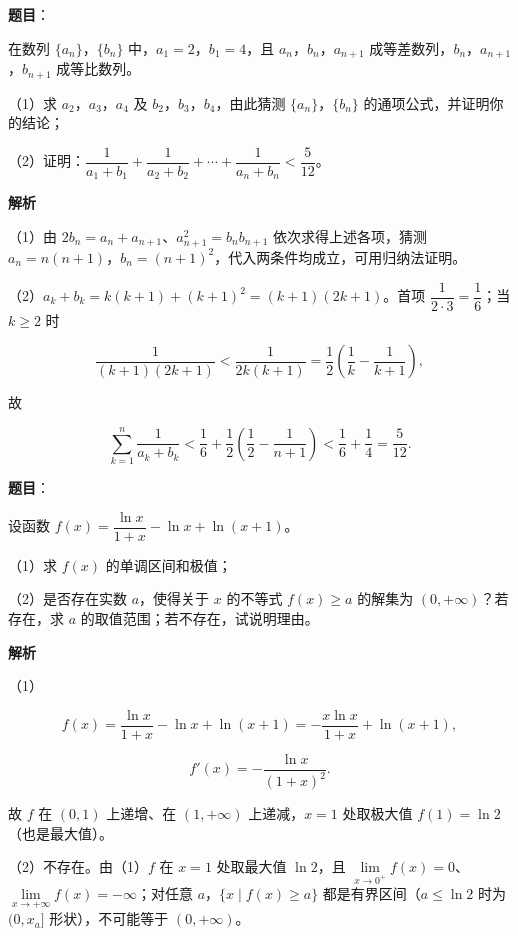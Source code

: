 \begin{answer}

\textbf{题目}：

在数列 $\{a_n\}$，$\{b_n\}$ 中，$a_1=2$，$b_1=4$，且 $a_n$，$b_n$，$a_{n+1}$ 成等差数列，$b_n$，$a_{n+1}$，$b_{n+1}$ 成等比数列。

（1）求 $a_2$，$a_3$，$a_4$ 及 $b_2$，$b_3$，$b_4$，由此猜测 $\{a_n\}$，$\{b_n\}$ 的通项公式，并证明你的结论；

（2）证明：$\dfrac1{a_1+b_1}+\dfrac1{a_2+b_2}+\cdots+\dfrac1{a_n+b_n}<\dfrac5{12}$。

\textbf{解析}

（1）由 $2b_n=a_n+a_{n+1}$、$a_{n+1}^2=b_nb_{n+1}$ 依次求得上述各项，猜测 $a_n=n(n+1)$，$b_n=(n+1)^2$，代入两条件均成立，可用归纳法证明。

（2）$a_k+b_k=k(k+1)+(k+1)^2=(k+1)(2k+1)$。首项 $\dfrac1{2\cdot3}=\dfrac16$；当 $k\geqslant2$ 时

\nopagebreak[4]
\[\frac1{(k+1)(2k+1)}<\frac1{2k(k+1)}=\frac12\left(\frac1k-\frac1{k+1}\right),\]

故

\nopagebreak[4]
\[\sum_{k=1}^n\frac1{a_k+b_k}<\frac16+\frac12\left(\frac12-\frac1{n+1}\right)<\frac16+\frac14=\frac5{12}.\]


\end{answer}
\begin{answer}

\textbf{题目}：

设函数 $f(x)=\dfrac{\ln x}{1+x}-\ln x+\ln(x+1)$。

（1）求 $f(x)$ 的单调区间和极值；

（2）是否存在实数 $a$，使得关于 $x$ 的不等式 $f(x)\geqslant a$ 的解集为 $(0,+\infty)$？若存在，求 $a$ 的取值范围；若不存在，试说明理由。

\textbf{解析}

（1）

\nopagebreak[4]
\[f(x)=\frac{\ln x}{1+x}-\ln x+\ln(x+1)=-\frac{x\ln x}{1+x}+\ln(x+1),\]

\nopagebreak[4]
\[f'(x)=-\frac{\ln x}{(1+x)^2}.\]

故 $f$ 在 $(0,1)$ 上递增、在 $(1,+\infty)$ 上递减，$x=1$ 处取极大值 $f(1)=\ln2$（也是最大值）。

（2）不存在。由（1）$f$ 在 $x=1$ 处取最大值 $\ln2$，且 $\lim\limits_{x\to0^+}f(x)=0$、$\lim\limits_{x\to+\infty}f(x)=-\infty$；对任意 $a$，$\{x\mid f(x)\geqslant a\}$ 都是有界区间（$a\leqslant\ln2$ 时为 $(0,x_a]$ 形状），不可能等于 $(0,+\infty)$。


\end{answer}